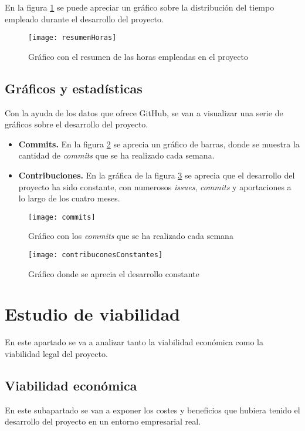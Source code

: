 En la figura \ref{fig:resumenHoras} se puede apreciar un gráfico sobre la distribución del tiempo empleado durante el desarrollo del proyecto.

\begin{figure}%
		\centering
		\texttt{[image: resumenHoras]}
		\caption{Gráfico con el resumen de las horas empleadas en el proyecto}\label{fig:resumenHoras}
	\end{figure}


\subsection{Gráficos y estadísticas}

Con la ayuda de los datos que ofrece GitHub, se van a visualizar una serie de gráficos sobre el desarrollo del proyecto.


\begin{itemize}
\item \textbf{Commits.} En la figura \ref{fig:commits} se aprecia un gráfico de barras, donde se muestra la cantidad de  \emph{commits} que se ha realizado cada semana.
\item \textbf{Contribuciones.} En la gráfica de la figura \ref{fig:contribuconesConstantes} se aprecia que el desarrollo del proyecto ha sido constante, con numerosos \emph{issues}, \emph{commits} y aportaciones a lo largo de los cuatro meses.
\end{itemize}

\begin{figure}%
		\centering
		\texttt{[image: commits]}
		\caption{Gráfico con los \emph{commits} que se ha realizado cada semana}\label{fig:commits}
	\end{figure}

\begin{figure}%
		\centering
		\texttt{[image: contribuconesConstantes]}
		\caption{Gráfico donde se aprecia el desarrollo constante}\label{fig:contribuconesConstantes}
	\end{figure}

\section{Estudio de viabilidad}
En este apartado se va a analizar tanto la viabilidad económica como la viabilidad legal del proyecto.


\subsection{Viabilidad económica} 
En este subapartado se van a exponer los costes y beneficios que hubiera tenido el desarrollo del proyecto en un entorno empresarial real. 

